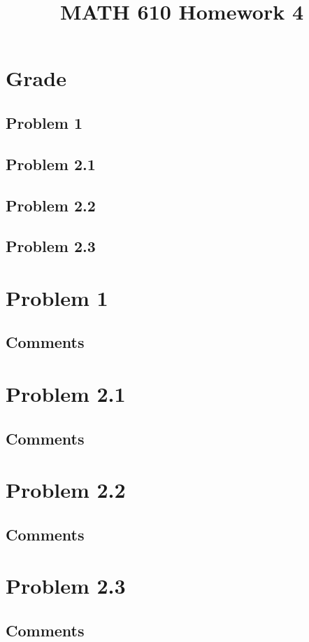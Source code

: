\documentclass{article}
\title{MATH 610 Homework 4}
\author{
}
\date{}
\newcommand{\problem}[2]{
    \section*{Problem #1}
    {#2}
    \vfill
    \subsection*{Comments}
    \newpage
}
\begin{document}
\maketitle
\newpage

\section*{Grade}
\subsection*{Problem 1}
\subsection*{Problem 2.1}
\subsection*{Problem 2.2}
\subsection*{Problem 2.3}
\newpage

\problem{1}{
}

\problem{2.1}{
}

\problem{2.2}{
}

\problem{2.3}{
}
\end{document}
